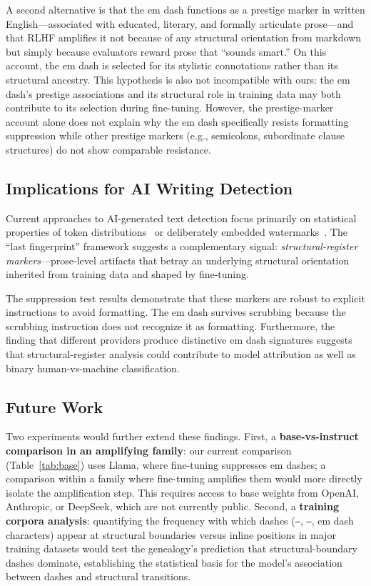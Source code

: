 A second alternative is that the em dash functions as a prestige marker in written English---associated with educated, literary, and formally articulate prose---and that RLHF amplifies it not because of any structural orientation from markdown but simply because evaluators reward prose that ``sounds smart.'' On this account, the em dash is selected for its stylistic connotations rather than its structural ancestry. This hypothesis is also not incompatible with ours: the em dash's prestige associations and its structural role in training data may both contribute to its selection during fine-tuning. However, the prestige-marker account alone does not explain why the em dash specifically resists formatting suppression while other prestige markers (e.g., semicolons, subordinate clause structures) do not show comparable resistance.

\subsection{Implications for AI Writing Detection}

Current approaches to AI-generated text detection focus primarily on statistical properties of token distributions~\cite{mitchell2023detectgpt} or deliberately embedded watermarks~\cite{kirchenbauer2023watermark}. The ``last fingerprint'' framework suggests a complementary signal: \textit{structural-register markers}---prose-level artifacts that betray an underlying structural orientation inherited from training data and shaped by fine-tuning.

The suppression test results demonstrate that these markers are robust to explicit instructions to avoid formatting. The em dash survives scrubbing because the scrubbing instruction does not recognize it as formatting. Furthermore, the finding that different providers produce distinctive em dash signatures suggests that structural-register analysis could contribute to model attribution as well as binary human-vs-machine classification.

\subsection{Future Work}

Two experiments would further extend these findings. First, a \textbf{base-vs-instruct comparison in an amplifying family}: our current comparison (Table~\ref{tab:base}) uses Llama, where fine-tuning suppresses em dashes; a comparison within a family where fine-tuning amplifies them would more directly isolate the amplification step. This requires access to base weights from OpenAI, Anthropic, or DeepSeek, which are not currently public. Second, a \textbf{training corpora analysis}: quantifying the frequency with which dashes (\texttt{---}, \texttt{--}, em dash characters) appear at structural boundaries versus inline positions in major training datasets would test the genealogy's prediction that structural-boundary dashes dominate, establishing the statistical basis for the model's association between dashes and structural transitions.

